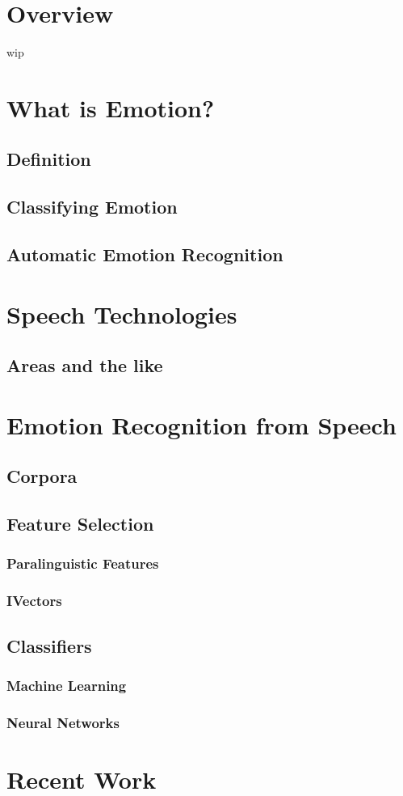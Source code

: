 \section{Overview}
	wip
\section{What is Emotion?}

\subsection{Definition}

\subsection{Classifying Emotion}

\subsection{Automatic Emotion Recognition}

\section{Speech Technologies}

\subsection{Areas and the like}

\section{Emotion Recognition from Speech}

\subsection{Corpora}

\subsection{Feature Selection}

\subsubsection{Paralinguistic Features}

\subsubsection{IVectors}

\subsection{Classifiers}

\subsubsection{Machine Learning}

\subsubsection{Neural Networks}

\section{Recent Work}
